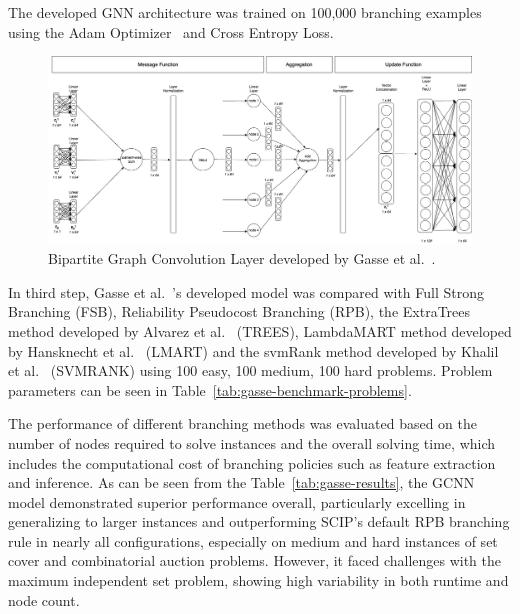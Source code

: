 The developed GNN architecture was trained on 100,000 branching examples using the Adam Optimizer~\cite{kingmaAdamMethodStochastic2017} and Cross Entropy Loss.

\begin{figure}[htb!]
    \centering
    \includegraphics[width=1\textwidth]{figures/Convolution}
    \caption{Bipartite Graph Convolution Layer developed by Gasse et al.~\cite{gasseExactCombinatorialOptimization2019}.}
    \label{fig:convolution}
\end{figure}


In third step, Gasse et al.~\cite{gasseExactCombinatorialOptimization2019}'s developed model was compared with Full Strong Branching (FSB), Reliability Pseudocost Branching (RPB), the ExtraTrees method developed by Alvarez et al.~\cite{alvarezMachineLearningBasedApproximation2017} (TREES), LambdaMART method developed by Hansknecht et al.~\cite{hansknechtCutsPrimalHeuristics2018a} (LMART) and the svmRank method developed by Khalil et al.~\cite{khalilLearningBranchMixed2016} (SVMRANK) using 100 easy, 100 medium, 100 hard problems.
Problem parameters can be seen in Table~\ref{tab:gasse-benchmark-problems}.



The performance of different branching methods was evaluated based on the number of nodes required to solve instances and the overall solving time, which includes the computational cost of branching policies such as feature extraction and inference.
As can be seen from the Table~\ref{tab:gasse-results}, the GCNN model demonstrated superior performance overall, particularly excelling in generalizing to larger instances and outperforming SCIP's default RPB branching rule in nearly all configurations, especially on medium and hard instances of set cover and combinatorial auction problems.
However, it faced challenges with the maximum independent set problem, showing high variability in both runtime and node count.



